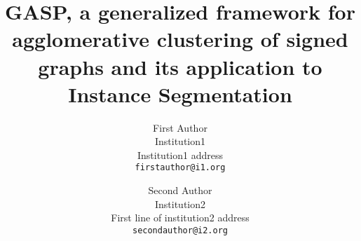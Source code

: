 \documentclass[10pt,twocolumn,letterpaper]{article}
\theoremstyle{definition}
\theoremstyle{remark}
\begin{document}
\title{GASP, a generalized framework for agglomerative clustering of signed graphs and its application to Instance Segmentation} %





\author{First Author\\
Institution1\\
Institution1 address\\
{\tt\small firstauthor@i1.org}
\and
Second Author\\
Institution2\\
First line of institution2 address\\
{\tt\small secondauthor@i2.org}
}


\maketitle
\end{document}
